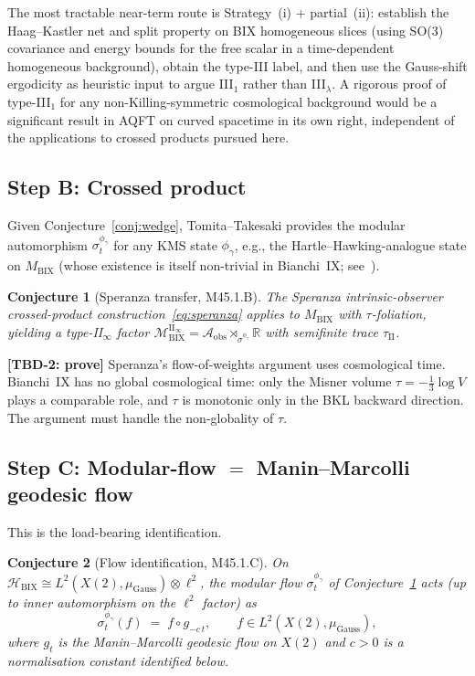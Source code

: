 \documentclass[12pt,a4paper]{article}
\newtheorem{conjecture}{Conjecture}
\begin{document}
\noindent The most tractable near-term route is
Strategy~(i) $+$ partial~(ii):
establish the Haag--Kastler net and split property on BIX homogeneous
slices (using SO(3) covariance and energy bounds for the free scalar
in a time-dependent homogeneous background), obtain the type-III label,
and then use the Gauss-shift ergodicity as heuristic input to argue
III$_1$ rather than III$_\lambda$.
A rigorous proof of type-III$_1$ for any non-Killing-symmetric cosmological
background would be a significant result in AQFT on curved spacetime
in its own right, independent of the applications to crossed products
pursued here.

\subsection{Step B: Crossed product}\label{ssec:crossed}

Given Conjecture~\ref{conj:wedge}, Tomita--Takesaki provides the
modular automorphism $\sigma_t^{\phi_\gamma}$ for any KMS state
$\phi_\gamma$, e.g., the Hartle--Hawking-analogue state on
$M_{\mathrm{BIX}}$ (whose existence is itself non-trivial in
Bianchi~IX; see~\cite{HeinzleUggla2009}).

\begin{conjecture}[Speranza transfer, M45.1.B]\label{conj:speranza}
The Speranza intrinsic-observer crossed-product
construction~\eqref{eq:speranza} applies to $M_{\mathrm{BIX}}$ with
$\tau$-foliation, yielding a type-II$_\infty$ factor
$\mathcal{M}_{\mathrm{BIX}}^{\mathrm{II}_\infty}
= \mathcal{A}_{\mathrm{obs}}\rtimes_{\sigma^{\phi_\gamma}}\mathbb{R}$
with semifinite trace $\tau_{\mathrm{II}}$.
\end{conjecture}

\noindent\textbf{[TBD-2: prove]} Speranza's flow-of-weights argument
uses cosmological time. Bianchi~IX has no global cosmological time:
only the Misner volume $\tau = -\frac{1}{3}\log V$ plays a comparable
role, and $\tau$ is monotonic only in the BKL backward direction.
The argument must handle the non-globality of $\tau$.

\subsection{Step C: Modular-flow $=$ Manin--Marcolli geodesic flow}\label{ssec:mm-flow}

This is the load-bearing identification.

\begin{conjecture}[Flow identification, M45.1.C]\label{conj:flow}
On $\mathcal{H}_{\mathrm{BIX}} \cong L^2(X(2),\mu_{\mathrm{Gauss}})\otimes\ell^2$,
the modular flow $\sigma_t^{\phi_\gamma}$ of Conjecture~\ref{conj:speranza}
acts (up to inner automorphism on the $\ell^2$ factor) as
\begin{equation}
  \sigma_t^{\phi_\gamma}(f)
  \;=\; f \circ g_{-c\,t},\qquad
  f \in L^2(X(2),\mu_{\mathrm{Gauss}}),
  \label{eq:flow-id}
\end{equation}
where $g_t$ is the Manin--Marcolli geodesic flow on $X(2)$ and
$c > 0$ is a normalisation constant identified below.
\end{conjecture}
\end{document}
